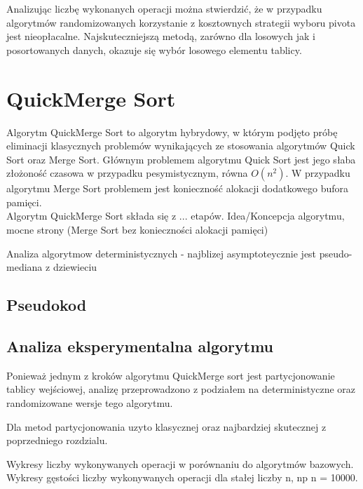 Analizując liczbę wykonanych operacji można stwierdzić, że w przypadku algorytmów randomizowanych korzystanie z kosztownych strategii wyboru pivota jest nieopłacalne. Najskuteczniejszą metodą, zarówno dla losowych jak i posortowanych danych, okazuje się wybór losowego elementu tablicy.\\


\section{QuickMerge Sort}

Algorytm QuickMerge Sort to algorytm hybrydowy, w którym podjęto próbę eliminacji klasycznych problemów wynikających ze stosowania algorytmów Quick Sort oraz Merge Sort. Głównym problemem algorytmu Quick Sort jest jego słaba złożoność czasowa w przypadku pesymistycznym, równa $O(n^2)$.  W przypadku algorytmu Merge Sort problemem jest konieczność alokacji dodatkowego bufora pamięci.\\ 

Algorytm QuickMerge Sort składa się z ... etapów.
Idea/Koncepcja algorytmu, mocne strony (Merge Sort bez konieczności alokacji pamięci)

Analiza algorytmow deterministycznych - najblizej asymptoteycznie jest pseudo-mediana z dziewieciu
\subsection{Pseudokod}

\subsection{Analiza eksperymentalna algorytmu}
Ponieważ jednym z kroków algorytmu QuickMerge sort jest partycjonowanie tablicy wejściowej, analizę przeprowadzono z podziałem na deterministyczne oraz randomizowane wersje tego algorytmu.

Dla metod partycjonowania uzyto klasycznej oraz najbardziej skutecznej z poprzedniego rozdzialu.

Wykresy liczby wykonywanych operacji w porównaniu do algorytmów bazowych.
Wykresy gęstości liczby wykonywanych operacji dla stałej liczby n, np n = 10000.

